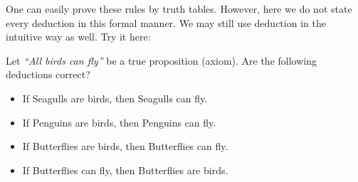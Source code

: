 One can easily prove these rules by truth tables.
However, here we do not state every deduction in this formal manner. We may still use deduction in the intuitive way as well. Try it here:

\begin{exercise}{}
Let \emph{``All birds can fly''} be a true proposition (axiom). 
Are the following deductions correct?
 			\begin{itemize}
 				\item If Seagulls are birds, then Seagulls can fly.
 				\item If Penguins are birds, then Penguins can fly.
 				\item If Butterflies are birds, then Butterflies can fly.
 				\item If Butterflies can fly, then Butterflies are birds.
			\end{itemize} 			 
\end{exercise}